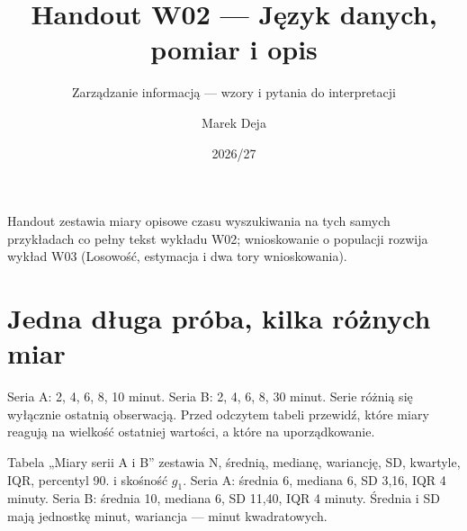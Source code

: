\documentclass[
  polish,
  11pt,
  a4paper,
]{article}
\title{Handout W02 --- Język danych, pomiar i opis}
\subtitle{Zarządzanie informacją --- wzory i pytania do interpretacji}
\author{Marek Deja}
\date{2026/27}
\begin{document}
\maketitle

Handout zestawia miary opisowe czasu wyszukiwania na tych samych
przykładach co pełny tekst wykładu W02; wnioskowanie o populacji rozwija
wykład W03 (Losowość, estymacja i dwa tory wnioskowania).

\section{Jedna długa próba, kilka różnych
miar}\label{jedna-dux142uga-pruxf3ba-kilka-ruxf3ux17cnych-miar}

Seria A: 2, 4, 6, 8, 10 minut. Seria B: 2, 4, 6, 8, 30 minut. Serie
różnią się wyłącznie ostatnią obserwacją. Przed odczytem tabeli
przewidź, które miary reagują na wielkość ostatniej wartości, a które na
uporządkowanie.

Tabela „Miary serii A i B'' zestawia N, średnią, medianę, wariancję, SD,
kwartyle, IQR, percentyl 90. i skośność \(g_1\). Seria A: średnia 6,
mediana 6, SD 3,16, IQR 4 minuty. Seria B: średnia 10, mediana 6, SD
11,40, IQR 4 minuty. Średnia i SD mają jednostkę minut, wariancja ---
minut kwadratowych.
\end{document}

